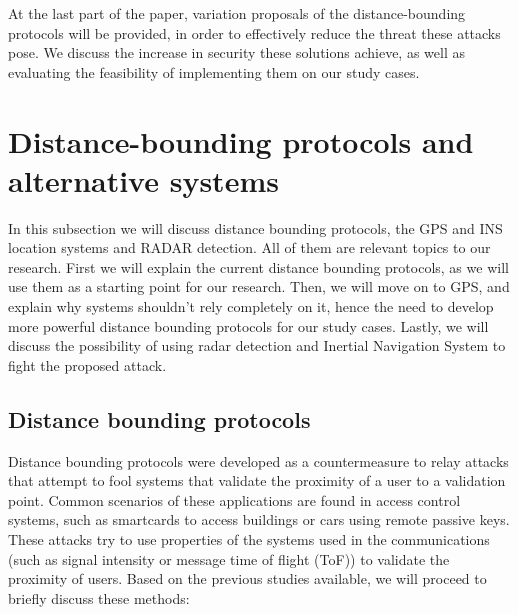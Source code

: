 \documentclass{article}
\begin{document}
At the last part of the paper, variation proposals of the distance-bounding protocols will be provided, in order to effectively reduce the threat these attacks pose. We discuss the increase in security these solutions achieve, as well as evaluating the feasibility of implementing them on our study cases.\\













\section{Distance-bounding protocols and alternative systems}
\label{sec:dbandalternative}

In this subsection we will discuss distance bounding protocols, the GPS and INS location systems and RADAR detection. All of them are relevant topics to our research. First we will explain the current distance bounding protocols, as we will use them as a starting point for our research. Then, we will move on to GPS, and explain why systems shouldn't rely completely on it, hence the need to develop more powerful distance bounding protocols for our study cases. Lastly, we will discuss the possibility of using radar detection and Inertial Navigation System to fight the proposed attack.\\

\subsection{Distance bounding protocols}

Distance bounding protocols were developed as a countermeasure to relay attacks that attempt to fool systems that validate the proximity of a user to a validation point. Common scenarios of these applications are found in access control systems, such as smartcards to access buildings or cars using remote passive keys.\\

These attacks try to use properties of the systems used in the communications (such as signal intensity or message time of flight (ToF)) to validate the proximity of users. Based on the previous studies available\cite{capkun2006secure}, we will proceed to briefly discuss these methods:\\
\end{document}

